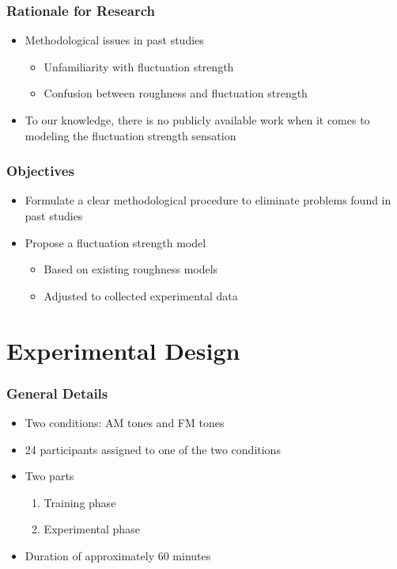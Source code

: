 \documentclass{beamer}
\begin{document}
\begin{frame}
  \frametitle{Rationale for Research}
  \begin{itemize}
    \item Methodological issues in past studies
    \pause{}
    \begin{itemize}
      \item Unfamiliarity with fluctuation strength
      \pause{}
      \item Confusion between roughness and fluctuation strength
    \end{itemize}
    \pause{}
    \item To our knowledge, there is no publicly available work when it comes to
      modeling the fluctuation strength sensation
  \end{itemize}
\end{frame}

\begin{frame}
  \frametitle{Objectives}
  \begin{itemize}
    \item Formulate a clear methodological procedure to eliminate problems
      found in past studies
    \pause{}
    \item Propose a fluctuation strength model
    \pause{}
    \begin{itemize}
      \item Based on existing roughness models
      \pause{}
      \item Adjusted to collected experimental data
    \end{itemize}
  \end{itemize}
\end{frame}

\section{Experimental Design}

\begin{frame}
  \frametitle{General Details}
  \begin{itemize}
    \item Two conditions: AM tones and FM tones
    \pause{}
    \item 24 participants assigned to one of the two conditions
    \pause{}
    \item Two parts
      \begin{enumerate}
        \item Training phase
        \item Experimental phase
      \end{enumerate}
    \pause{}
    \item Duration of approximately 60 minutes
  \end{itemize}
\end{frame}
\end{document}
